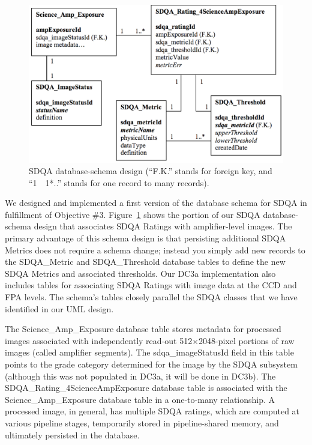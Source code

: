\begin{figure}[tbh]
\begin{centering}
\includegraphics[scale=0.4]{images/O7A2_1}
\caption{SDQA database-schema design (``F.K.'' stands for foreign key, and ``1~{\jot 24pt}~1*..'' stands for one record to many records).} 
 \label{DB}
\end{centering}
\end{figure}

We designed and implemented a first version of the database schema for SDQA in fulfillment
of Objective \#3.  Figure~\ref{DB} shows the portion of our SDQA database-schema design
that associates SDQA Ratings with amplifier-level images.  
The primary advantage of this schema design is that persisting additional SDQA Metrics
does not require a schema change; instead you simply add new records to the SDQA\_Metric
and SDQA\_Threshold database tables to define the new SDQA Metrics and associated thresholds.
Our DC3a implementation also
includes tables for associating SDQA Ratings with image data at the CCD and FPA levels.
The schema's tables closely parallel the SDQA classes that we have identified in our UML design.

The Science\_Amp\_Exposure database table stores metadata for
processed images associated with independently read-out 
512$\times$2048-pixel portions of 
raw images (called amplifier 
segments).  The sdqa\_imageStatusId field in this table points to the grade
category determined for the image by the SDQA subsystem (although this was not populated
in DC3a, it will be done in DC3b).  
The SDQA\_Rating\_4ScienceAmpExposure database table is associated with 
the Science\_Amp\_Exposure database table in a one-to-many
relationship.  A processed image, in general, has multiple SDQA ratings, which
are computed at various pipeline stages, temporarily stored in pipeline-shared memory, and 
ultimately persisted in the database.



